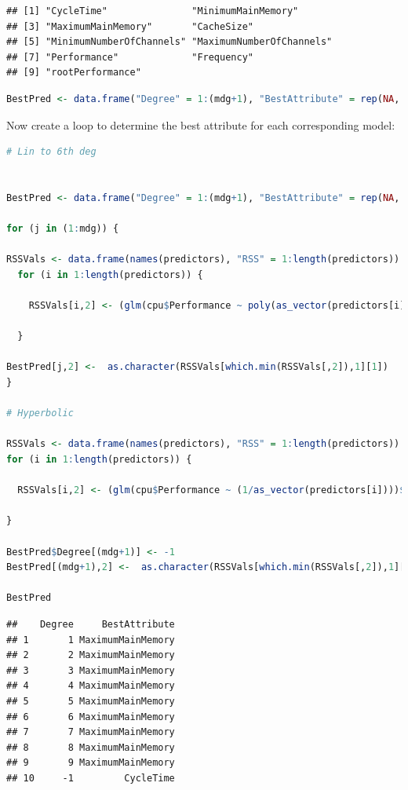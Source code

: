 \documentclass[
]{article}
\begin{document}
\begin{lstlisting}
## [1] "CycleTime"               "MinimumMainMemory"      
## [3] "MaximumMainMemory"       "CacheSize"              
## [5] "MinimumNumberOfChannels" "MaximumNumberOfChannels"
## [7] "Performance"             "Frequency"              
## [9] "rootPerformance"
\end{lstlisting}

\begin{lstlisting}[language=R]
BestPred <- data.frame("Degree" = 1:(mdg+1), "BestAttribute" = rep(NA, (mdg+1)))
\end{lstlisting}

Now create a loop to determine the best attribute for each corresponding
model:

\begin{lstlisting}[language=R]
# Lin to 6th deg


BestPred <- data.frame("Degree" = 1:(mdg+1), "BestAttribute" = rep(NA, (mdg+1)))

for (j in (1:mdg)) {
  
RSSVals <- data.frame(names(predictors), "RSS" = 1:length(predictors))
  for (i in 1:length(predictors)) {
    
    RSSVals[i,2] <- (glm(cpu$Performance ~ poly(as_vector(predictors[i]), j))$residuals)^2 %>% sum()
    
  }

BestPred[j,2] <-  as.character(RSSVals[which.min(RSSVals[,2]),1][1])
}

# Hyperbolic

RSSVals <- data.frame(names(predictors), "RSS" = 1:length(predictors))
for (i in 1:length(predictors)) {
  
  RSSVals[i,2] <- (glm(cpu$Performance ~ (1/as_vector(predictors[i])))$residuals)^2 %>% sum()
  
}

BestPred$Degree[(mdg+1)] <- -1
BestPred[(mdg+1),2] <-  as.character(RSSVals[which.min(RSSVals[,2]),1][1])

BestPred
\end{lstlisting}

\begin{lstlisting}
##    Degree     BestAttribute
## 1       1 MaximumMainMemory
## 2       2 MaximumMainMemory
## 3       3 MaximumMainMemory
## 4       4 MaximumMainMemory
## 5       5 MaximumMainMemory
## 6       6 MaximumMainMemory
## 7       7 MaximumMainMemory
## 8       8 MaximumMainMemory
## 9       9 MaximumMainMemory
## 10     -1         CycleTime
\end{lstlisting}
\end{document}
